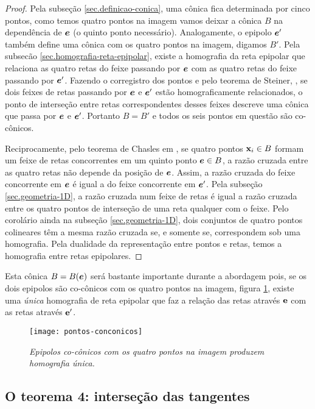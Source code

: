 \begin{proof}
Pela subseção \ref{sec.definicao-conica}, uma cônica fica determinada por cinco pontos, como temos quatro pontos na imagem vamos deixar a cônica $B$ na dependência de $\boldsymbol{e}$ (o quinto ponto necessário). Analogamente, o epipolo $\boldsymbol{e}'$ também define uma cônica com os quatro pontos na imagem, digamos $B'$. Pela subsec\~ao \ref{sec.homografia-reta-epipolar}, existe a homografia da reta epipolar que relaciona as quatro retas do feixe passando por $\boldsymbol{e}$ com as quatro retas do feixe passando por $\boldsymbol{e}'$. Fazendo o corregistro dos pontos e pelo teorema de Steiner, \citep{kneebone}, se dois feixes de retas passando por $\boldsymbol{e}$ e $\boldsymbol{e}'$ estão homograficamente relacionados, o ponto de interseção entre retas correspondentes desses feixes descreve uma cônica que passa por $\boldsymbol{e}$ e $\boldsymbol{e}'$. Portanto $B=B'$ e todos os seis pontos em questão são co-cônicos.


Reciprocamente, pelo teorema de Chasles em \citep{kneebone}, se quatro pontos $\mathbf{x}_i \in B$ formam um feixe de retas concorrentes em um quinto ponto $\boldsymbol{e}\in B$, a razão cruzada entre as quatro retas não depende da posição de $\boldsymbol{e}$. Assim, a razão cruzada  do feixe concorrente em $\boldsymbol{e}$ é igual a do feixe concorrente em $\boldsymbol{e}'$. Pela subseção \ref{sec.geometria-1D}, a razão cruzada num feixe de retas é igual a razão cruzada entre os quatro pontos de interseção de uma reta qualquer com o feixe. Pelo corolário ainda na subseção \ref{sec.geometria-1D}, dois conjuntos de quatro pontos colineares têm a mesma razão cruzada se, e somente se, correspondem sob uma homografia.  Pela dualidade da representação entre pontos e retas, temos a homografia entre retas epipolares.  
\end{proof}

Esta cônica $B=B(\boldsymbol{e})$ será bastante importante durante a abordagem pois, se os dois epipolos são co-cônicos com os quatro pontos na imagem, figura \ref{pontos-conconicos}, existe uma \textit{única} homografia de reta epipolar que faz a relação das retas através ${\bf e}$ com as retas através ${\bf e'}$. 

\begin{figure}[!htb]
\centering
\texttt{[image: pontos-conconicos]}
\caption{\textit{Epipolos co-cônicos com os quatro pontos na imagem produzem homografia única.}}
\label{pontos-conconicos}
\end{figure}

\subsection{O teorema 4: interseção das tangentes}\label{sec.demonstracao-teo-4}

